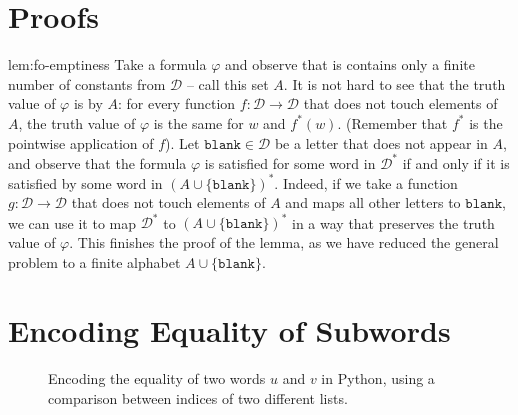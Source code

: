 \section{Proofs}

\begin{proofof}{lem:fo-emptiness}
    Take a formula $\varphi$ and observe that is contains only a finite number of constants from $\mathcal{D}$ -- call this set $A$.
    It is not hard to see that the truth value of $\varphi$ is  by $A$: for every function $f : \mathcal{D} \to \mathcal{D}$
    that does not touch 
    elements of $A$, the truth value of $\varphi$ is the same for $w$ and $f^*(w)$. (Remember that 
    $f^*$ is the pointwise application of $f$). 
    Let $\mathtt{blank} \in \mathcal{D}$ be a letter that does not appear in $A$,
    and observe that the formula $\varphi$ is satisfied for some word in $\mathcal{D}^*$ if and only if it is satisfied by
    some word in $(A \cup \{\mathtt{blank}\})^*$. Indeed, if we take a function $g: \mathcal{D} \to \mathcal{D}$ that does not touch elements of $A$
    and maps all other letters to $\mathtt{blank}$, we can use it to map $\mathcal{D}^*$ to $(A \cup \{\mathtt{blank}\})^*$ in a way 
    that preserves the truth value of $\varphi$.
    This finishes the proof of the lemma, as we have reduced the general problem to a finite alphabet $A \cup \{\mathtt{blank}\}$.
\end{proofof}

\section{Encoding Equality of Subwords}

\begin{figure}
    \centering
\begin{Shaded}
\begin{Highlighting}[]
     
         
            \OperatorTok{==}\OperatorTok{!=}
                 
     
\end{Highlighting}
\end{Shaded}
\caption{Encoding the equality of two words $u$ and $v$ in Python,
using a comparison between indices of two different lists.}
\label{fig:eq-def-different-indices}
\end{figure}

